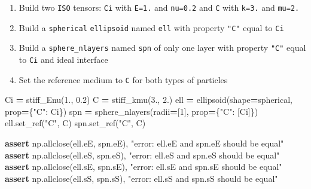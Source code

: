 \documentclass[
  a4paper,
  numbers=noendperiod,
  DIV=12]{scrreprt}
\newenvironment{Shaded}{\begin{snugshade}}{\end{snugshade}}
\newcommand{\ControlFlowTok}[1]{\textcolor[rgb]{0.13,0.29,0.53}{\textbf{#1}}}
\newcommand{\DecValTok}[1]{\textcolor[rgb]{0.00,0.00,0.81}{#1}}
\newcommand{\FloatTok}[1]{\textcolor[rgb]{0.00,0.00,0.81}{#1}}
\newcommand{\NormalTok}[1]{#1}
\newcommand{\OperatorTok}[1]{\textcolor[rgb]{0.81,0.36,0.00}{\textbf{#1}}}
\newcommand{\StringTok}[1]{\textcolor[rgb]{0.31,0.60,0.02}{#1}}
\providecommand{\tightlist}{%
  \setlength{\itemsep}{0pt}\setlength{\parskip}{0pt}}
\begin{document}
\begin{tcolorbox}[enhanced jigsaw, arc=.35mm, bottomrule=.15mm, bottomtitle=1mm, breakable, colback=white, colbacktitle=quarto-callout-caution-color!10!white, colframe=quarto-callout-caution-color-frame, coltitle=black, left=2mm, leftrule=.75mm, opacityback=0, opacitybacktitle=0.6, rightrule=.15mm, title={Exercise}, titlerule=0mm, toprule=.15mm, toptitle=1mm]

\begin{enumerate}
\def\labelenumi{\arabic{enumi}.}
\tightlist
\item
  Build two \texttt{ISO} tensors: \texttt{Ci} with \texttt{E=1.} and
  \texttt{nu=0.2} and \texttt{C} with \texttt{k=3.} and \texttt{mu=2.}
\item
  Build a \texttt{spherical} \texttt{ellipsoid} named \texttt{ell} with
  property \texttt{"C"} equal to \texttt{Ci}
\item
  Build a \texttt{sphere\_nlayers} named \texttt{spn} of only one layer
  with property \texttt{"C"} equal to \texttt{Ci} and ideal interface
\item
  Set the reference medium to \texttt{C} for both types of particles
\end{enumerate}

\begin{Shaded}
\begin{Highlighting}[]
\NormalTok{Ci }\OperatorTok{=}\NormalTok{ stiff\_Enu(}\FloatTok{1.}\NormalTok{, }\FloatTok{0.2}\NormalTok{)}
\NormalTok{C }\OperatorTok{=}\NormalTok{ stiff\_kmu(}\FloatTok{3.}\NormalTok{, }\FloatTok{2.}\NormalTok{)}
\NormalTok{ell }\OperatorTok{=}\NormalTok{ ellipsoid(shape}\OperatorTok{=}\NormalTok{spherical, prop}\OperatorTok{=}\NormalTok{\{}\StringTok{"C"}\NormalTok{: Ci\})}
\NormalTok{spn }\OperatorTok{=}\NormalTok{ sphere\_nlayers(radii}\OperatorTok{=}\NormalTok{[}\DecValTok{1}\NormalTok{], prop}\OperatorTok{=}\NormalTok{\{}\StringTok{"C"}\NormalTok{: [Ci]\})}
\NormalTok{ell.set\_ref(}\StringTok{"C"}\NormalTok{, C)}
\NormalTok{spn.set\_ref(}\StringTok{"C"}\NormalTok{, C)}
\end{Highlighting}
\end{Shaded}

\begin{Shaded}
\begin{Highlighting}[]
\ControlFlowTok{assert}\NormalTok{ np.allclose(ell.eE, spn.eE), }\StringTok{"error: ell.eE and spn.eE should be equal"}
\ControlFlowTok{assert}\NormalTok{ np.allclose(ell.eS, spn.eS), }\StringTok{"error: ell.eS and spn.eS should be equal"}
\ControlFlowTok{assert}\NormalTok{ np.allclose(ell.sE, spn.sE), }\StringTok{"error: ell.sE and spn.sE should be equal"}
\ControlFlowTok{assert}\NormalTok{ np.allclose(ell.sS, spn.sS), }\StringTok{"error: ell.sS and spn.sS should be equal"}
\end{Highlighting}
\end{Shaded}


\end{tcolorbox}
\end{document}
